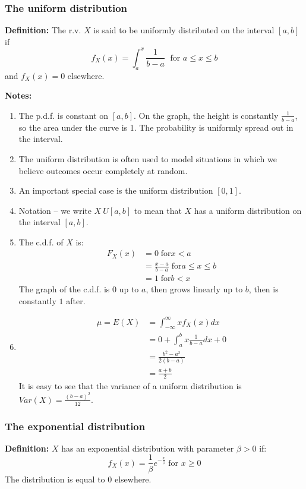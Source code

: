 \documentclass[12pt]{article}
\begin{document}
\subsubsection{The uniform distribution}
\textbf{Definition:} The r.v. $X$ is said to be uniformly distributed on the interval $[a,b]$ if
\[
    f_X (x) = \int_a^x \frac{1}{b-a} \; \text{ for } a \leq x \leq b
\]
and $f_X (x) = 0$ elsewhere.

\textbf{Notes:}
\begin{enumerate}
    \item The p.d.f. is constant on $[a,b]$. On the graph, the height is constantly $\frac{1}{b-a}$, so the area under the curve is 1. The probability is uniformly spread out in the interval.
    \item The uniform distribution is often used to model situations in which we believe outcomes occur completely at random.
    \item An important special case is the uniform distribution $[0,1]$.
    \item Notation -- we write $X ~ U[a,b]$ to mean that $X$ has a uniform distribution on the interval $[a,b]$.
    \item The c.d.f. of $X$ is:
        \begin{align*}
            F_X (x) &= 0 \; \text{for} x < a \\
                &= \frac{x-a}{b-a} \; \text{for} a \leq x \leq b \\
                &= 1 \; \text{for} b < x
        \end{align*}
        The graph of the c.d.f. is $0$ up to $a$, then grows linearly up to $b$, then is constantly $1$ after.
    \item
        \begin{align*}
            \mu = E(X) &= \int_{-\infty}^{\infty} x f_X (x) dx \\
                &= 0 + \int_a^b x \frac{1}{b-a} dx + 0 \\
                &= \frac{b^2 -a^2}{2(b-a)} \\
                &= \frac{a+b}{2}
        \end{align*}
        It is easy to see that the variance of a uniform distribution is $Var(X) = \frac{(b-a)^2}{12}$.
\end{enumerate}

\subsubsection{The exponential distribution}
\textbf{Definition:} $X$ has an exponential distribution with parameter $\beta > 0$ if:
\[
    f_X (x) = \frac{1}{\beta} e^{- \frac{x}{\beta}} \; \text{for } x \geq 0
\]
The distribution is equal to $0$ elsewhere.
\end{document}
